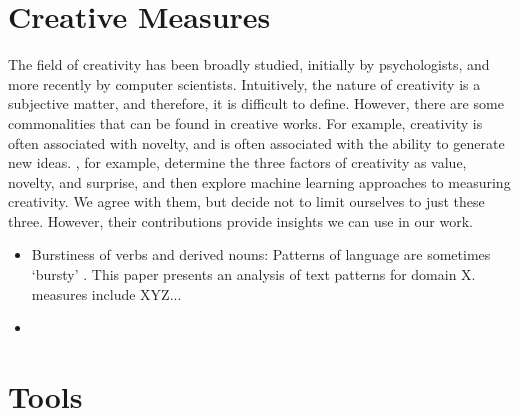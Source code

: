 \section{Creative Measures}
The field of creativity has been broadly studied, initially by psychologists, and more recently by computer scientists. 
Intuitively, the nature of creativity is a subjective matter, and therefore, it is difficult to define. However, there are some commonalities that can be found in creative works. For example, creativity is often associated with novelty, and is often associated with the ability to generate new ideas. \cite{franceschelli_deepcreativity_2022}, for example, determine the three factors of creativity as value, novelty, and surprise, and then explore machine learning approaches to measuring creativity. We agree with them, but decide not to limit ourselves to just these three. However, their contributions provide insights we can use in our work.  
\begin{itemize}
    \item Burstiness of verbs and derived nouns: Patterns of language are sometimes `bursty' \cite{pierrehumbert_burstiness_2012}. This paper presents an analysis of text patterns for domain X. measures include XYZ...
    \item 
\end{itemize}

\section{Tools}
